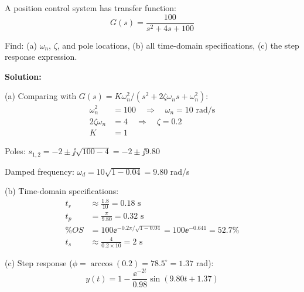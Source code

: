 \begin{examplebox}[title=Example 7.2: Second-Order System Analysis]
A position control system has transfer function:
\begin{equation}
G(s) = \frac{100}{s^2 + 4s + 100}
\end{equation}

Find: (a) $\omega_n$, $\zeta$, and pole locations, (b) all time-domain specifications, (c) the step response expression.

\textbf{Solution:}

(a) Comparing with $G(s) = K\omega_n^2/(s^2 + 2\zeta\omega_n s + \omega_n^2)$:
\begin{align}
\omega_n^2 &= 100 \quad \Rightarrow \quad \omega_n = 10 \text{ rad/s} \\
2\zeta\omega_n &= 4 \quad \Rightarrow \quad \zeta = 0.2 \\
K &= 1
\end{align}

Poles: $s_{1,2} = -2 \pm \jj\sqrt{100 - 4} = -2 \pm \jj 9.80$

Damped frequency: $\omega_d = 10\sqrt{1 - 0.04} = 9.80$ rad/s

(b) Time-domain specifications:
\begin{align}
t_r &\approx \frac{1.8}{10} = 0.18 \text{ s} \\
t_p &= \frac{\pi}{9.80} = 0.32 \text{ s} \\
\%OS &= 100\ee^{-0.2\pi/\sqrt{1-0.04}} = 100\ee^{-0.641} = 52.7\% \\
t_s &\approx \frac{4}{0.2 \times 10} = 2 \text{ s}
\end{align}

(c) Step response ($\phi = \arccos(0.2) = 78.5^\circ = 1.37$ rad):
\begin{equation}
y(t) = 1 - \frac{\ee^{-2t}}{0.98}\sin(9.80t + 1.37)
\end{equation}
\end{examplebox}

